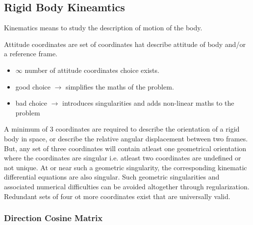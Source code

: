 \subsection{Rigid Body Kineamtics}
Kinematics means to study the description of motion of the body.

Attitude coordinates are set of coordinates hat describe attitude of body and/or a reference frame.

\begin{itemize}
	\item \(\infty \) number of attitude coordinates choice exists.
	\item good choice \(\to\) simplifies the maths of the problem.
	\item bad choice \(\to\) introduces singularities and adds non-linear maths to the problem
\end{itemize}

A minimum of 3 coordinates are required to describe the orientation of a rigid body in space, or describe the relative angular displacement between two frames. But, any set of three coordinates will contain atleast one geometrical orientation where the coordinates are singular i.e. atleast two coordinates are undefined or not unique. At or near such a geometric singularity, the corresponding kinematic differential equations are also singular. Such geometric singularities and associated numerical difficulties can be avoided altogether through regularization. Redundant sets of four ot more coordinates exist that are universally valid.

\subsubsection{Direction Cosine Matrix}
